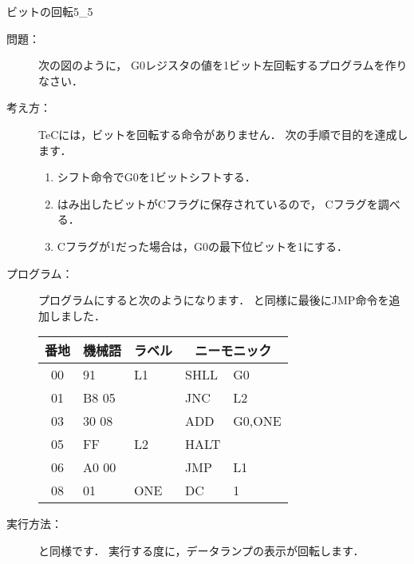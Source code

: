 \newpage
\begin{reidai}{ビットの回転}{5_5}
  \begin{description}
  \item[問題：] 次の図のように，
    G0レジスタの値を1ビット左回転するプログラムを作りなさい．

    \begin{center}
    \end{center}

  \item[考え方：]
    TeCには，ビットを回転する命令がありません．
    次の手順で目的を達成します．
    \begin{enumerate}
    \item シフト命令でG0を1ビットシフトする．
    \item はみ出したビットがCフラグに保存されているので，
      Cフラグを調べる．
    \item Cフラグが1だった場合は，G0の最下位ビットを1にする．
    \end{enumerate}

    \begin{center}
    \end{center}

  \item[プログラム：]
    プログラムにすると次のようになります．
    と同様に最後にJMP命令を追加しました．

    {\ttfamily\small\begin{center}
      \begin{tabular}{|c|l|l|l l|} \hline
        番地 & 機械語 & ラベル & \multicolumn{2}{|c|}{ニーモニック} \\
        \hline
        00 & 91    & L1  & SHLL & G0     \\
        01 & B8 05 &     & JNC  & L2     \\
        03 & 30 08 &     & ADD  & G0,ONE \\
        05 & FF    & L2  & HALT &        \\
        06 & A0 00 &     & JMP  & L1     \\
        08 & 01    & ONE & DC   & 1      \\
        \hline
      \end{tabular}
    \end{center}}

  \item[実行方法：] と同様です．
    実行する度に，データランプの表示が回転します．
  \end{description}
\end{reidai}

